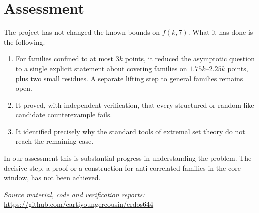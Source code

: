 \documentclass[11pt]{article}
\begin{document}
\section{Assessment}
The project has not changed the known bounds on $f(k,7)$. What it has done is the following.
\begin{enumerate}[label=(\roman*)]
\item For families confined to at most $3k$ points, it reduced the asymptotic question to a single explicit statement
about covering families on $1.75k$--$2.25k$ points, plus two small residues. A separate lifting step to general
families remains open.
\item It proved, with independent verification, that every structured or random-like candidate counterexample fails.
\item It identified precisely why the standard tools of extremal set theory do not reach the remaining case.
\end{enumerate}
In our assessment this is substantial progress in understanding the problem. The decisive step, a proof or a
construction for anti-correlated families in the core window, has not been achieved.

\medskip\noindent\textit{Source material, code and verification reports:}\\
\url{https://github.com/cartiyoungercousin/erdos644}
\end{document}
